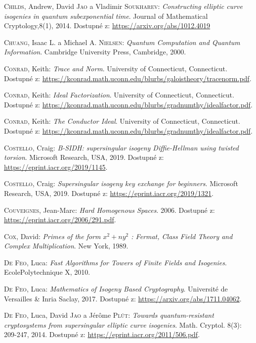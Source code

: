 \documentclass[12pt]{report}
\begin{document}
\begin{thebibliography}{97}
\textsc{Childs}, Andrew, David \textsc{Jao} a Vladimir \textsc{Soukharev}: \textit{Constructing elliptic curve isogenies in quantum subexponential time}. Journal of Mathematical Cryptology,8(1), 2014. Dostupné z: \url{https://arxiv.org/abs/1012.4019}

\textsc{Chuang}, Isaac L. a Michael A. \textsc{Nielsen}: \textit{Quantum Computation and Quantum Information}. Cambridge University Press, Cambridge, 2000. 

\textsc{Conrad}, Keith: \textit{Trace and Norm}. University of Connecticut, Connecticut. Dostupné z: \url{https://kconrad.math.uconn.edu/blurbs/galoistheory/tracenorm.pdf}.

\textsc{Conrad}, Keith: \textit{Ideal Factorization}. University of Connecticut, Connecticut. Dostupné z: \url{https://kconrad.math.uconn.edu/blurbs/gradnumthy/idealfactor.pdf}.

\textsc{Conrad}, Keith: \textit{The Conductor Ideal}. University of Connecticut, Connecticut. Dostupné z: \url{https://kconrad.math.uconn.edu/blurbs/gradnumthy/idealfactor.pdf}.

\textsc{Costello}, Craig: \textit{B-SIDH: supersingular isogeny Diffie-Hellman using twisted torsion}. Microsoft Research, USA, 2019. Dostupné z: \url{https://eprint.iacr.org/2019/1145}.

\textsc{Costello}, Craig: \textit{Supersingular isogeny key exchange for beginners}. Microsoft Research, USA, 2019. Dostupné z: \url{https://eprint.iacr.org/2019/1321}.


\textsc{Couveignes}, Jean-Marc: \textit{Hard Homogenous Spaces}. 2006. Dostupné z: \url{https://eprint.iacr.org/2006/291.pdf}.

\textsc{Cox}, David: \textit{Primes of the form $x^2+n y^2$ : Fermat, Class Field Theory and Complex Multiplication}. New York, 1989.

\textsc{De Feo}, Luca: \textit{Fast Algorithms for Towers of Finite Fields and Isogenies}. EcolePolytechnique X, 2010. 

\textsc{De Feo}, Luca: \textit{Mathematics of Isogeny Based Cryptography}. Université de Versailles \& Inria Saclay, 2017. Dostupné z: \url{https://arxiv.org/abs/1711.04062}.

\textsc{De Feo}, Luca, David \textsc{Jao} a Jérôme \textsc{Plût}: \textit{Towards quantum-resistant cryptosystems from supersingular elliptic curve isogenies}. Math. Cryptol. 8(3): 209-247, 2014. Dostupné z: \url{https://eprint.iacr.org/2011/506.pdf}.


\end{thebibliography}
\end{document}
